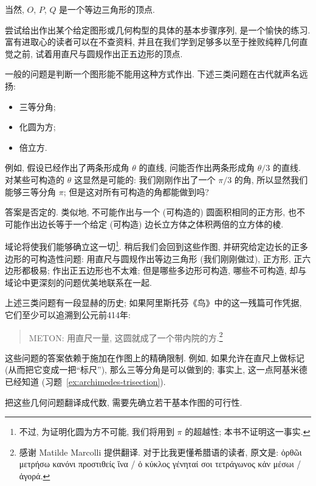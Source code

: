 当然, $O$, $P$, $Q$ 是一个等边三角形的顶点.

尝试给出作出某个给定图形或几何构型的具体的基本步骤序列, 是一个愉快的练习. 富有进取心的读者可以在不查资料, 并且在我们学到足够多以至于挫败纯粹几何直觉之前, 试着用直尺与圆规作出正五边形的顶点.

一般的问题是判断一个图形能不能用这种方式作出. 下述三类问题在古代就声名远扬:

\begin{itemize}
\item 三等分角;
\item 化圆为方;
\item 倍立方.
\end{itemize}

例如, 假设已经作出了两条形成角 $\theta$ 的直线, 问能否作出两条形成角 $\theta/3$ 的直线. 对某些可构造的 $\theta$ 这显然是可能的: 我们刚刚作出了一个 $\pi/3$ 的角, 所以显然我们能够三等分角 $\pi$; 但是这对所有可构造的角都能做到吗?

答案是否定的. 类似地, 不可能作出与一个 (可构造的) 圆面积相同的正方形, 也不可能作出边长等于一个给定 (可构造) 边长立方体之体积两倍的立方体的棱.

域论将使我们能够确立这一切\footnote{不过, 为证明化圆为方不可能, 我们将用到 $\pi$ 的超越性; 本书不证明这一事实.}. 稍后我们会回到这些作图, 并研究给定边长的正多边形的可构造性问题: 用直尺与圆规作出等边三角形 (我们刚刚做过), 正方形, 正六边形都极易; 作出正五边形也不太难; 但是哪些多边形可构造, 哪些不可构造, 却与域论中更深刻的问题优美地联系在一起.

上述三类问题有一段显赫的历史; 如果阿里斯托芬《鸟》中的这一残篇可作凭据, 它们至少可以追溯到公元前414年:

\begin{quote}
METON: 用直尺一量, 这圆就成了一个带内院的方.\footnote{感谢 Matilde Marcolli 提供翻译. 对于比我更懂希腊语的读者, 原文是: { ὀρθῶι μετρήσω κανόνι προστιθείς ἵνα / ὁ κύκλος γένηταί σοι τετράγωνος κἀν μέσωι / ἀγορά.}}
\end{quote}

这些问题的答案依赖于施加在作图上的精确限制. 例如, 如果允许在直尺上做标记 (从而把它变成一把``标尺''), 那么三等分角是可以做到的; 事实上, 这一点阿基米德已经知道 (习题~\ref{ex:archimedes-trisection}).

把这些几何问题翻译成代数, 需要先确立若干基本作图的可行性.

